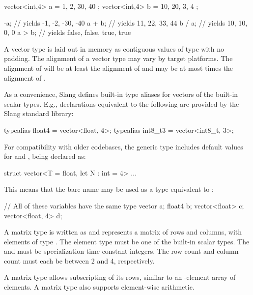 \begin{codeblock}
vector<int,4> a = { 1, 2, 30, 40 };
vector<int,4> b = { 10, 20, 3, 4 };

-a; // yields { -1, -2, -30, -40 }
a + b; // yields { 11, 22, 33, 44 }
b / a; // yields { 10, 10, 0, 0 }
a > b; // yields { false, false, true, true }
\end{codeblock}

A vector type is laid out in memory as  contiguous values of type  with no padding.
The alignment of a vector type may vary by target platforms.
The alignment of  will be at least the alignment of  and may be at most  times the alignment of .

As a convenience, Slang defines built-in type aliases for vectors of the built-in scalar types.
E.g., declarations equivalent to the following are provided by the Slang standard library:

\begin{codeblock}
typealias float4 = vector<float, 4>;
typealias int8_t3 = vector<int8_t, 3>;
\end{codeblock}


For compatibility with older codebases, the generic  type includes default values for  and , being declared as:

\begin{codeblock}
struct vector<T = float, let N : int = 4> { ... }
\end{codeblock}

This means that the bare name  may be used as a type equivalent to :

\begin{codeblock}
// All of these variables have the same type
vector a;
float4 b;
vector<float> c;
vector<float, 4> d;
\end{codeblock}


A matrix type is written as  and represents a matrix of  rows and  columns, with elements of type .
The element type  must be one of the built-in scalar types.
The   and   must be specialization-time constant integers.
The row count and column count must each be between 2 and 4, respectively.

A matrix type allows subscripting of its rows, similar to an -element array of  elements.
A matrix type also supports element-wise arithmetic.

